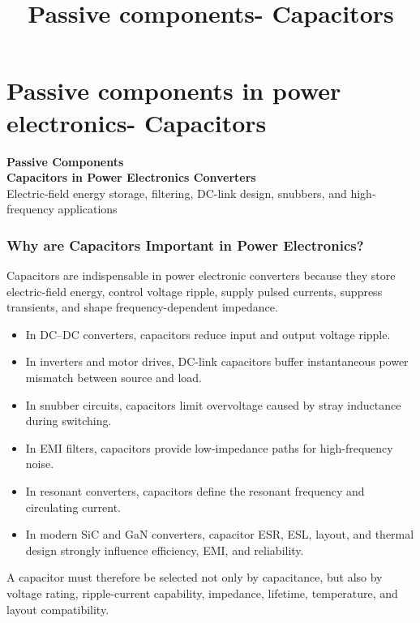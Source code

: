 \section{Passive components in power electronics- Capacitors}
\title[Passive components- Capacitors]{Passive components- Capacitors}  

\begin{frame}[plain]
    \titlepage
\end{frame}

\begin{frame}
\begin{center}
  \textbf{\Huge{Passive Components}}\\[0.4cm]
  \textbf{\Large{Capacitors in Power Electronics Converters}}\\[0.8cm]

  \large
  Electric-field energy storage, filtering, DC-link design, snubbers, and high-frequency applications
\end{center}
\end{frame}


\begin{frame}
\frametitle{Why are Capacitors Important in Power Electronics?}

Capacitors are indispensable in power electronic converters because they store electric-field energy, control voltage ripple, supply pulsed currents, suppress transients, and shape frequency-dependent impedance.

\begin{itemize}
    \item In DC--DC converters, capacitors reduce input and output voltage ripple.
    \item In inverters and motor drives, DC-link capacitors buffer instantaneous power mismatch between source and load.
    \item In snubber circuits, capacitors limit overvoltage caused by stray inductance during switching.
    \item In EMI filters, capacitors provide low-impedance paths for high-frequency noise.
    \item In resonant converters, capacitors define the resonant frequency and circulating current.
    \item In modern SiC and GaN converters, capacitor ESR, ESL, layout, and thermal design strongly influence efficiency, EMI, and reliability.
\end{itemize}

A capacitor must therefore be selected not only by capacitance, but also by voltage rating, ripple-current capability, impedance, lifetime, temperature, and layout compatibility.

\end{frame}


